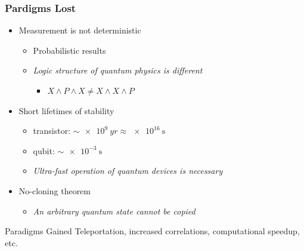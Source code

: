 \documentclass[handout]{beamer}
\begin{document}
\begin{frame}
  \frametitle{Pardigms Lost}
  \begin{itemize}
  \item Measurement is not deterministic
    \begin{itemize}
    \item Probabilistic results
    \item \emph{Logic structure of quantum physics is different}
      \begin{itemize}
      \item $X \land P \land X \neq X \land X \land P$
      \end{itemize}
    \end{itemize}
  \item Short lifetimes of stability
    \begin{itemize}
    \item transistor: $\sim \SI{e9}{yr} \approx \SI{e16}{\second}$
    \item qubit: $\sim \SI{e-3}{\second}$
    \item \emph{Ultra-fast operation of quantum devices is necessary}
    \end{itemize}
  \item No-cloning theorem
    \begin{itemize}
    \item \emph{An arbitrary quantum state cannot be copied}
    \end{itemize}
  \end{itemize}
  \begin{block}{Paradigms Gained}
    Teleportation, increased correlations, computational speedup, etc.
  \end{block}
\end{frame}
\end{document}
